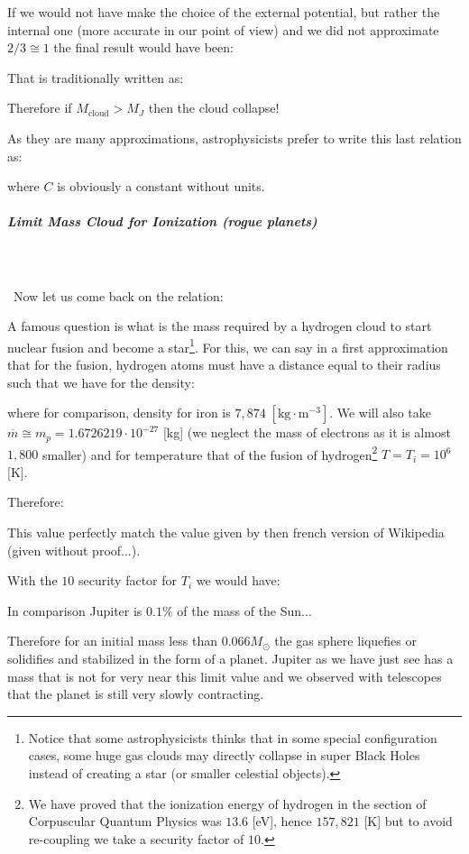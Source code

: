 	If we would not have make the choice of the external potential, but rather the internal one (more accurate in our point of view) and we did not approximate $2/3\cong 1$ the final result would have been:
	
	That is traditionally written as:
	
	Therefore if $M_\text{cloud}>M_J$ then the cloud collapse!
	
	As they are many approximations, astrophysicists prefer to write this last relation as:
	
	where $C$ is obviously a constant without units.
	
	\pagebreak
	\subparagraph{Limit Mass Cloud for Ionization (rogue planets)}\mbox{}\\\\\
	Now let us come back on the relation:
	
	A famous question is what is the mass required by a hydrogen cloud to start nuclear fusion and become a star\footnote{Notice that some astrophysicists thinks that in some special configuration cases, some huge gas clouds may directly collapse in super Black Holes instead of creating a star (or smaller celestial objects).}. For this, we can say in a first approximation that for the fusion, hydrogen atoms must have a distance equal to their radius such that we have for the density:
	
	where for comparison, density for iron is $7,874\;[\text{kg}\cdot \text{m}^{-3}]$. We will also take $\overline{m}\cong m_p = 1.6726219\cdot 10^{-27}$ [kg] (we neglect the mass of electrons as it is almost $1,800$ smaller) and for temperature that of the fusion of hydrogen\footnote{We have proved that the ionization energy of hydrogen in the section of Corpuscular Quantum Physics was $13.6$ [eV], hence $157,821$ [K] but to avoid re-coupling we take a security factor of $10$.} $T=T_i=10^6$ [K].
	
	Therefore:
	
	This value perfectly match the value given by then french version of Wikipedia (given without proof...).
	
	With the $10$ security factor for $T_i$ we would have:
	
	In comparison Jupiter is $0.1\%$ of the mass of the Sun...
	
	Therefore for an initial mass less than $0.066 M_\odot $ the gas sphere liquefies or solidifies and stabilized in the form of a planet. Jupiter as we have just see has a mass that is not for very near this limit value and we observed with telescopes that the planet is still very slowly contracting. 
	
